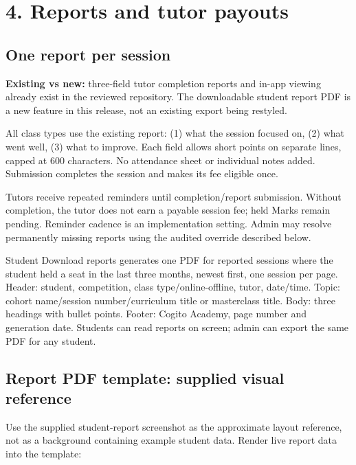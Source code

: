 \documentclass[11pt,a4paper]{article}
\begin{document}
\section*{4. Reports and tutor payouts}

\subsection*{One report per session}

\textbf{Existing vs new:} three-field tutor completion reports and in-app viewing already exist in the reviewed repository. The downloadable student report PDF is a new feature in this release, not an existing export being restyled.

All class types use the existing report: (1) what the session focused on, (2) what went well, (3) what to improve. Each field allows short points on separate lines, capped at 600 characters. No attendance sheet or individual notes added. Submission completes the session and makes its fee eligible once.

Tutors receive repeated reminders until completion/\allowbreak{}report submission. Without completion, the tutor does not earn a payable session fee; held Marks remain pending. Reminder cadence is an implementation setting. Admin may resolve permanently missing reports using the audited override described below.

Student Download reports generates one PDF for reported sessions where the student held a seat in the last three months, newest first, one session per page. Header: student, competition, class type/\allowbreak{}online-offline, tutor, date/\allowbreak{}time. Topic: cohort name/\allowbreak{}session number/\allowbreak{}curriculum title or masterclass title. Body: three headings with bullet points. Footer: Cogito Academy, page number and generation date. Students can read reports on screen; admin can export the same PDF for any student.

\subsection*{Report PDF template: supplied visual reference}

Use the supplied student-report screenshot as the approximate layout reference, not as a background containing example student data. Render live report data into the template:
\end{document}
